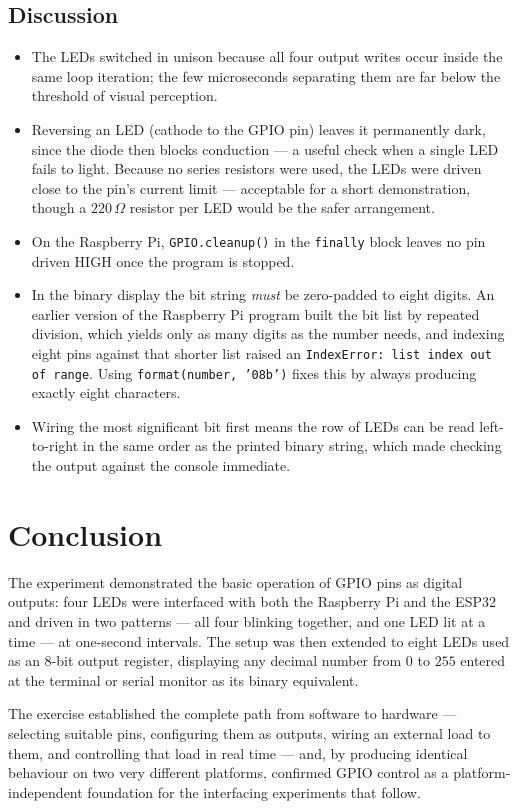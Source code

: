 \documentclass[10pt,a4paper]{article}
\begin{document}
\vspace{6pt}

\subsection*{Discussion}
\begin{itemize}
  \item The LEDs switched in unison because all four output writes occur inside the
        same loop iteration; the few microseconds separating them are far below the
        threshold of visual perception.
  \item Reversing an LED (cathode to the GPIO pin) leaves it permanently dark, since
        the diode then blocks conduction --- a useful check when a single LED fails
        to light. Because no series resistors were used, the LEDs were driven close
        to the pin's current limit --- acceptable for a short demonstration, though a
        $220\,\Omega$ resistor per LED would be the safer arrangement.
  \item On the Raspberry Pi, \texttt{GPIO.cleanup()} in the \texttt{finally} block
        leaves no pin driven HIGH once the program is stopped.
  \item In the binary display the bit string \emph{must} be zero-padded to eight
        digits. An earlier version of the Raspberry Pi program built the bit list by
        repeated division, which yields only as many digits as the number needs, and
        indexing eight pins against that shorter list raised an
        \texttt{IndexError: list index out of range}. Using
        \texttt{format(number, '08b')} fixes this by always producing exactly eight
        characters.
  \item Wiring the most significant bit first means the row of LEDs can be read
        left-to-right in the same order as the printed binary string, which made
        checking the output against the console immediate.
\end{itemize}

\section{Conclusion}

The experiment demonstrated the basic operation of GPIO pins as digital outputs: four
LEDs were interfaced with both the Raspberry Pi and the ESP32 and driven in two
patterns --- all four blinking together, and one LED lit at a time --- at one-second
intervals. The setup was then extended to eight LEDs used as an 8-bit output register,
displaying any decimal number from $0$ to $255$ entered at the terminal or serial
monitor as its binary equivalent.

The exercise established the complete path from software to hardware --- selecting
suitable pins, configuring them as outputs, wiring an external load to them, and
controlling that load in real time --- and, by producing identical
behaviour on two very different platforms, confirmed GPIO control as a
platform-independent foundation for the interfacing experiments that follow.
\end{document}
